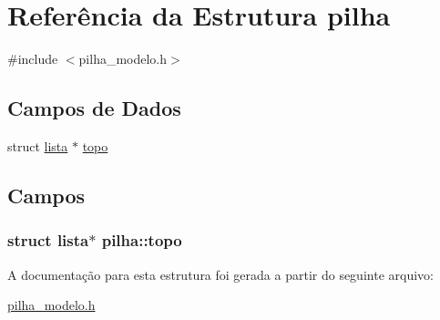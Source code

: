 \hypertarget{structpilha}{}\section{Referência da Estrutura pilha}
\label{structpilha}


{\ttfamily \#include $<$pilha\+\_\+modelo.\+h$>$}

\subsection*{Campos de Dados}
\begin{DoxyCompactItemize}
\item 
struct \hyperlink{structlista}{lista} $\ast$ \hyperlink{structpilha_af710a80cc659420807a4e273fba075a1}{topo}
\end{DoxyCompactItemize}


\subsection{Campos}
\subsubsection[{\texorpdfstring{topo}{topo}}]{\setlength{\rightskip}{0pt plus 5cm}struct {\bf lista}$\ast$ pilha\+::topo}\hypertarget{structpilha_af710a80cc659420807a4e273fba075a1}{}\label{structpilha_af710a80cc659420807a4e273fba075a1}


A documentação para esta estrutura foi gerada a partir do seguinte arquivo\+:\begin{DoxyCompactItemize}
\item 
\hyperlink{pilha__modelo_8h}{pilha\+\_\+modelo.\+h}\end{DoxyCompactItemize}
